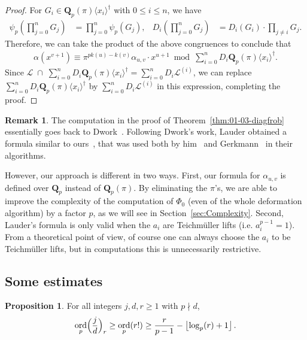 \documentclass[a4paper,11pt]{article}
\numberwithin{equation}{section}
\providecommand{\floor}[1]{\left\lfloor#1\right\rfloor}   %
\newcommand{\QQ}{\mathbf{Q}} %
\DeclareMathOperator{\ord}{ord}          %
\theoremstyle{definition}
\newtheorem{prop}[thm]{Proposition}
\newtheorem{rem}[thm]{Remark}
\begin{document}
\begin{proof}
For $G_i \in  \QQ_p(\pi) \langle x_i \rangle^{\dag}$ with $0 \leq i \leq n$, we have
\begin{align*}
\psi_p(\prod_{j=0}^n G_j) &= \prod_{j=0}^n \psi_p(G_j), &D_i(\prod_{j=0}^n G_j)&= D_i(G_i) \cdot \prod_{j \neq i} G_j.  
\end{align*}
Therefore, we can take the product of the above congruences to conclude that 
\begin{align*}
\alpha(x^{v+1}) \equiv \pi^{pk(u)-k(v)} \alpha_{u,v} \cdot x^{u+1} \bmod{\sum_{i=0}^n D_i \QQ_p(\pi) \langle x_i \rangle^{\dag}}.
\end{align*}
Since
$\mathcal{L} \; \cap \; \sum_{i=0}^n D_i \QQ_p(\pi) \langle x_i \rangle^{\dag} =  \sum_{i=0}^n D_i \mathcal{L}^{(i)}$,
we can replace $\sum_{i=0}^n D_i \QQ_p(\pi) \langle x_i \rangle^{\dag}$ 
by $\sum_{i=0}^n D_i \mathcal{L}^{(i)}$ in this expression, completing the proof.
\end{proof}

\begin{rem}
The computation in the proof of Theorem~\ref{thm:01-03-diagfrob} essentially goes back to Dwork~\citep[\S 4]{Dwork1964}. 
Following Dwork's work, Lauder obtained a formula similar to ours~\citep[Proposition 10]{Lauder2004b}, that
was used both by him~\citep{Lauder2004b} and Gerkmann~\citep{Gerkmann2007} in their algorithms. 

However, our approach is different in two ways.
First, our formula for $\alpha_{u,v}$ is defined over $\QQ_p$ instead of $\QQ_p(\pi)$. By eliminating the $\pi$'s, we are able to improve the complexity of
the computation of $\Phi_0$ (even of the whole deformation algorithm) by a factor $p$, as we will see in Section~\ref{sec:Complexity}. Second, Lauder's
formula is only valid when the $a_i$ are Teichm\"uller lifts (i.e. $a_i^{p-1}=1$). From a theoretical point of view, of course one can always choose the $a_i$ to be 
Teichm\"uller lifts, but in computations this is unnecessarily restrictive. 
\end{rem}

\subsection{Some estimates}

\begin{prop} \label{prop:rfac}
For all integers $j, d, r \geq 1$ with $p \nmid d$, 
\begin{equation*}
\ord_p\Bigl(\frac{j}{d}\Bigr)_r \geq \ord_p(r!) \geq \frac{r}{p-1} - \floor{\log_p(r) + 1}.
\end{equation*}
\end{prop}
\end{document}
